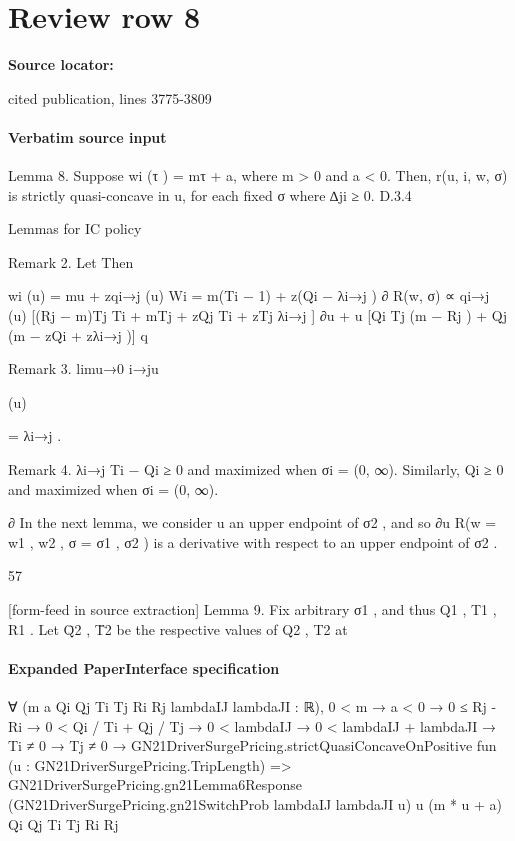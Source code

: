 \documentclass[10pt]{article}
\begin{document}
\section*{Review row 8}
\textbf{Source locator:} {\footnotesize\raggedright cited publication, lines 3775-\allowbreak{}3809\par}
\paragraph{Verbatim source input}
\begin{ReviewVerbatim}
Lemma 8. Suppose wi (τ ) = mτ + a, where m > 0 and a < 0. Then, r(u, i, w, σ) is strictly
quasi-concave in u, for each fixed σ where ∆ji ≥ 0.
D.3.4

Lemmas for IC policy

Remark 2.
Let
Then

wi (u) = mu + zqi→j (u)
Wi = m(Ti − 1) + z(Qi − λi→j )
∂
R(w, σ) ∝ qi→j (u) [(Rj − m)Tj Ti + mTj + zQj Ti + zTj λi→j ]
∂u
+ u [Qi Tj (m − Rj ) + Qj (m − zQi + zλi→j )]
q

Remark 3. limu→0 i→ju

(u)

= λi→j .

Remark 4. λi→j Ti − Qi ≥ 0 and maximized when σi = (0, ∞). Similarly, Qi ≥ 0 and maximized
when σi = (0, ∞).

∂
In the next lemma, we consider u an upper endpoint of σ2 , and so ∂u
R(w = {w1 , w2 }, σ =
{σ1 , σ2 }) is a derivative with respect to an upper endpoint of σ2 .

57


[form-feed in source extraction]
Lemma 9. Fix arbitrary σ1 , and thus Q1 , T1 , R1 . Let Q̄2 , T̄2 be the respective values of Q2 , T2 at
\end{ReviewVerbatim}



\paragraph{Expanded PaperInterface specification}
\begin{ReviewVerbatim}
∀ (m a Qi Qj Ti Tj Ri Rj lambdaIJ lambdaJI : ℝ),
  0 < m →
    a < 0 →
      0 ≤ Rj - Ri →
        0 < Qi / Ti + Qj / Tj →
          0 < lambdaIJ →
            0 < lambdaIJ + lambdaJI →
              Ti ≠ 0 →
                Tj ≠ 0 →
                  GN21DriverSurgePricing.strictQuasiConcaveOnPositive fun (u : GN21DriverSurgePricing.TripLength) =>
                    GN21DriverSurgePricing.gn21Lemma6Response
                      (GN21DriverSurgePricing.gn21SwitchProb lambdaIJ lambdaJI u) u (m * u + a) Qi Qj Ti Tj Ri Rj
\end{ReviewVerbatim}
\end{document}
